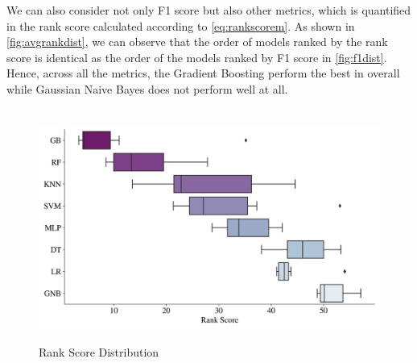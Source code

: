 We can also consider not only F1 score but also other metrics, which is quantified in the rank score calculated according to \autoref{eq:rankscorem}. As shown in \autoref{fig:avgrankdist}, we can observe that the order of models ranked by the rank score is identical as the order of the models ranked by F1 score in \autoref{fig:f1dist}.
Hence, across all the metrics, the Gradient Boosting perform the best in overall while Gaussian Naive Bayes does not perform well at all.
\begin{figure}[H]
    \centering
    \caption{Rank Score Distribution}\vspace{0.5em}
    \label{fig:avgrankdist}\
    \includegraphics[width=140mm]{Figures/AVG_RANK_Distribution.jpg}

    \vspace{-1em}
\end{figure}


